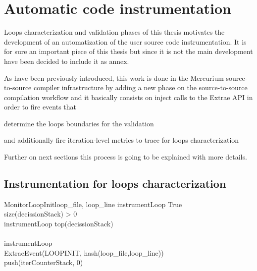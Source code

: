 \chapter{Automatic code instrumentation}\label{ann:automatic_code_instr}

Loops characterization and validation phases of this thesis motivates the development
of an automatization of the user source code instrumentation. It is for sure an
important piece of this thesis but since it is not the main development have been
decided to include it as annex.

As have been previously introduced, this work is done in the Mercurium source-to-source
compiler infrastructure by adding a new phase on the source-to-source compilation workflow
and it basically consists on inject calls to the Extrae API in order to fire events that
\begin{enumerate*}[label=\roman*)]
    \item determine the loops boundaries for the validation
    \item and additionally fire iteration-level metrics to trace for loops characterization
\end{enumerate*}
Further on next sections this process is going to be explained with more details.

\section{Instrumentation for loops characterization}\label{ann:automatic_loops_charac}

\begin{pseudocode}{MonitorLoopInit}{loop_{file}, loop_{line}}
\label{pc:mercurium_monitor_loop_init}
    instrumentLoop \GETS True\\
    \IF size(decissionStack) > 0 \THEN
    \BEGIN
      \\
      instrumentLoop \GETS top(decissionStack)\\
    \END\\
    \IF instrumentLoop \THEN
    \BEGIN
      \\
        ExtraeEvent(LOOPINIT, hash(loop_{file},loop_{line}))\\
        push(iterCounterStack, 0)\\
    \END
\end{pseudocode}

